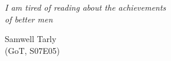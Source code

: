 
\begin{dedication}

\begin{center}
\textit{I am tired of reading about the achievements\\ of better men}
\end{center}

\begin{flushright}
Samwell Tarly\\
(GoT, S07E05)
\end{flushright}

\end{dedication}
